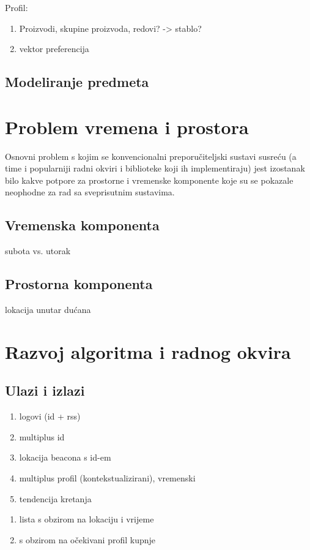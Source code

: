 \documentclass[times, utf8, diplomski, numeric]{fer}
\begin{document}
Profil:
\begin{enumerate}
  \item Proizvodi, skupine proizvoda, redovi? -> stablo?
  \item vektor preferencija
\end{enumerate}
\section{Modeliranje predmeta}

\chapter{Problem vremena i prostora}
Osnovni problem s kojim se konvencionalni preporučiteljski sustavi susreću (a
time i popularniji radni okviri i biblioteke koji ih implementiraju) jest
izostanak bilo kakve potpore za prostorne i vremenske komponente koje
su se pokazale neophodne za rad sa sveprisutnim sustavima.

\section{Vremenska komponenta}
\glqq subota \grqq vs. \glqq utorak \grqq
\section{Prostorna komponenta}
lokacija unutar dućana

\chapter{Razvoj algoritma i radnog okvira}
\section{Ulazi i izlazi}
\begin{enumerate}
  \item logovi (id + rss)
  \item multiplus id
  \item lokacija beacona s id-em
  \item multiplus profil (kontekstualizirani), vremenski
  \item tendencija kretanja
\end{enumerate}
\begin{enumerate}
  \item lista s obzirom na lokaciju i vrijeme
  \item s obzirom na očekivani profil kupnje
\end{enumerate}
\end{document}
